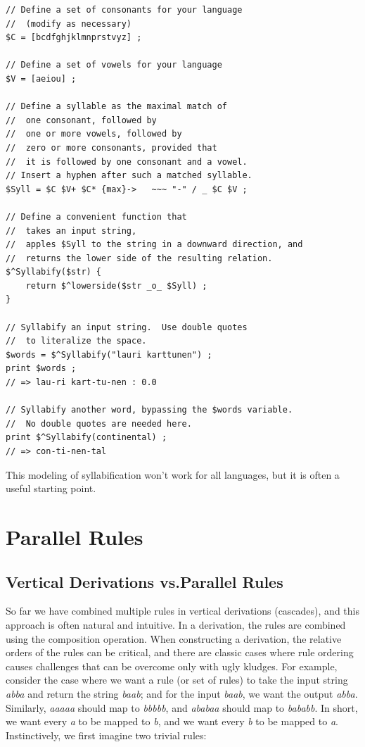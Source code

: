 \begin{Verbatim}
// Define a set of consonants for your language
// 	(modify as necessary)
$C = [bcdfghjklmnprstvyz] ;

// Define a set of vowels for your language
$V = [aeiou] ;

// Define a syllable as the maximal match of
//	one consonant, followed by
//	one or more vowels, followed by
//	zero or more consonants, provided that
//	it is followed by one consonant and a vowel.
// Insert a hyphen after such a matched syllable.
$Syll = $C $V+ $C* {max}->   ~~~ "-" / _ $C $V ;

// Define a convenient function that 
//	takes an input string,
//	apples $Syll to the string in a downward direction, and
//	returns the lower side of the resulting relation.
$^Syllabify($str) { 
	return $^lowerside($str _o_ $Syll) ; 
}

// Syllabify an input string.  Use double quotes
//	to literalize the space.
$words = $^Syllabify("lauri karttunen") ;
print $words ;	
// => lau-ri kart-tu-nen : 0.0

// Syllabify another word, bypassing the $words variable.
//	No double quotes are needed here.
print $^Syllabify(continental) ;
// => con-ti-nen-tal
\end{Verbatim}

This modeling of syllabification won't work for all languages, but it is often a
useful starting point.

\section{Parallel Rules}

\subsection{Vertical Derivations vs.\@ Parallel Rules}

So far we have combined multiple rules in vertical derivations (cascades), and this
approach is often natural and intuitive.  In a derivation, the rules are combined
using the composition operation.  When constructing a derivation, the relative orders of the
rules can be critical, and there are classic cases where rule ordering causes challenges
that can be overcome only with ugly kludges.  For example, consider the case where we want
a rule (or set of rules) to take the input string \emph{abba} and return the string
\emph{baab}; and for the input \emph{baab}, we want the output \emph{abba}.  Similarly,
\emph{aaaaa} should map to \emph{bbbbb}, and \emph{ababaa} should map to \emph{bababb}.  In
short, we want every \emph{a} to be mapped to \emph{b}, and we want every \emph{b} to be
mapped to \emph{a}.  Instinctively, we first imagine two trivial rules:


